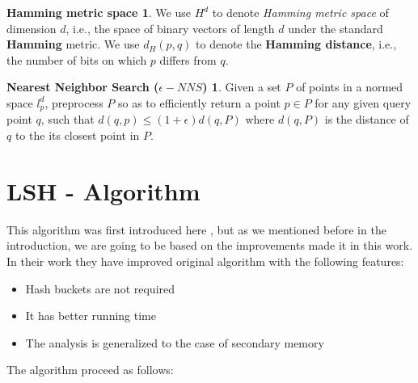\documentclass[12pt, a4paper]{article}
\theoremstyle{definition}
\newtheorem*{hamming}{Hamming metric space}
\newtheorem*{nns}{Nearest Neighbor Search ($\epsilon-NNS$)}
\begin{document}
\begin{hamming}
  We use $H^d$ to denote \textit{Hamming metric space} of dimension $d$, i.e., the space of binary vectors of length $d$ under the standard \textbf{Hamming} metric. We use $d_H(p,q)$ to denote the \textbf{Hamming distance}, i.e., the number of bits on which $p$ differs from $q$.
\end{hamming}

\begin{nns}
  Given a set $P$ of points in a normed space $l^{d}_p$, preprocess $P$ so as to efficiently return a point $p \in P$ for any given query point $q$, such that $d(q, p) \leq (1 + \epsilon)d(q,P)$ where $d(q, P)$ is the distance of $q$ to the its closest point
in $P$.
\end{nns}

\section{LSH - Algorithm}
This algorithm was first introduced here \cite{motwani_lsh}, but as we mentioned before in the introduction, we are going to be based on the improvements made it in this \cite{gionis_sim_search} work. In their work they have improved original algorithm with the following features:

\begin{itemize}
  \item Hash buckets are not required
  \item It has better running time
  \item The analysis is generalized to the case of secondary memory
\end{itemize}

The algorithm proceed as follows:
\end{document}
